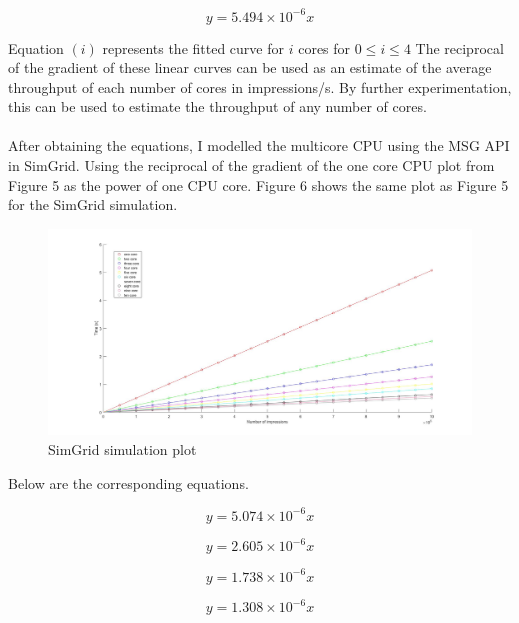 \documentclass[a4paper,11pt]{article}
\begin{document}
\begin{equation}
y = 5.494\times 10^{-6}x
\end{equation}

\noindent Equation $(i)$ represents the fitted curve for $i$ cores for $0 \leq i \leq 4$ The reciprocal of the gradient of these linear curves can be used as an estimate of the average throughput of each number of cores in impressions/s. By further experimentation, this can be used to estimate the throughput of any number of cores.
\\\\
\noindent After obtaining the equations, I modelled the multicore CPU using the MSG API in SimGrid. Using the reciprocal of the gradient of the one core CPU plot from Figure 5 as the power of one CPU core. Figure 6 shows the same plot as Figure 5 for the SimGrid simulation.

\begin{figure}[H]
	\hspace*{-2.8cm}  
	\includegraphics[scale=0.3]{images/multicore_sim}
	\caption{SimGrid simulation plot}
\end{figure}

\noindent Below are the corresponding equations.

\begin{equation}
y = 5.074\times 10^{-6}x
\end{equation}

\begin{equation}
y = 2.605\times 10^{-6}x
\end{equation}

\begin{equation}
y = 1.738\times 10^{-6}x
\end{equation}

\begin{equation}
y = 1.308\times 10^{-6}x
\end{equation}
\end{document}
